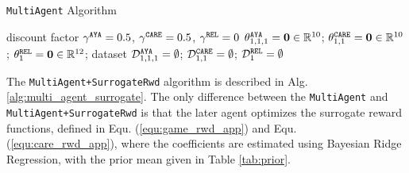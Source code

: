 \begin{algorithm}[hpt]
    \caption{\texttt{MultiAgent} Algorithm}
    \begin{algorithmic}[1]
         discount factor $\gamma^{\tiny\texttt{AYA}} = 0.5$, $\gamma^{\tiny\texttt{CARE}} = 0.5$, $\gamma^{\tiny\texttt{REL}} = 0$
         $\theta^{\tiny\texttt{AYA}}_{1,1,1} = \mathbf{0} \in \mathbb{R}^{10}$; $\theta^{\tiny\texttt{CARE}}_{1,1} = \mathbf{0} \in \mathbb{R}^{10}$; $\theta^{\tiny\texttt{REL}}_{1} = \mathbf{0} \in \mathbb{R}^{12}$; dataset $\mathcal{D}_{1,1,1}^{\tiny\texttt{AYA}} = \emptyset$; $\mathcal{D}_{1,1}^{\tiny\texttt{CARE}} = \emptyset$; $\mathcal{D}_{1}^{\tiny\texttt{REL}} = \emptyset$
                \ENDFOR
            \ENDFOR
        \ENDFOR
    \end{algorithmic}
    \label{alg:multi_agent}
\end{algorithm}

The \texttt{MultiAgent+SurrogateRwd} algorithm is described in Alg. \ref{alg:multi_agent_surrogate}. The only difference between the \texttt{MultiAgent} and \texttt{MultiAgent+SurrogateRwd} is that the later agent optimizes the surrogate reward functions, defined in Equ. (\ref{equ:game_rwd_app}) and Equ. (\ref{equ:care_rwd_app}), where the coefficients are estimated using Bayesian Ridge Regression, with the prior mean given in Table \ref{tab:prior}.

